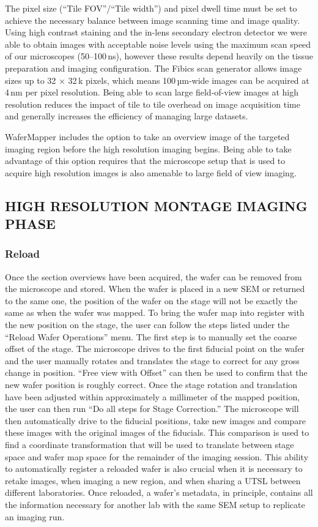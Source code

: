 \documentclass{article}
\begin{document}
The pixel size (“Tile FOV”/“Tile width”) and pixel dwell time must be set to achieve the necessary balance between image scanning time and image quality. Using high contrast staining and the in-lens secondary electron detector we were able to obtain images with acceptable noise levels using the maximum scan speed of our microscopes (50–100\,ns), however these results depend heavily on the tissue preparation and imaging configuration. The Fibics scan generator allows image sizes up to 32 × 32\,k pixels, which means 100\,µm-wide images can be acquired at 4\,nm per pixel resolution. Being able to scan large field-of-view images at high resolution reduces the impact of tile to tile overhead on image acquisition time and generally increases the efficiency of managing large datasets.

WaferMapper includes the option to take an overview image of the targeted imaging region before the high resolution imaging begins. Being able to take advantage of this option requires that the microscope setup that is used to acquire high resolution images is also amenable to large field of view imaging.

\subsection*{HIGH RESOLUTION MONTAGE IMAGING PHASE}
\subsubsection*{Reload}

Once the section overviews have been acquired, the wafer can be removed from the microscope and stored. When the wafer is placed in a new SEM or returned to the same one, the position of the wafer on the stage will not be exactly the same as when the wafer was mapped. To bring the wafer map into register with the new position on the stage, the user can follow the steps listed under the “Reload Wafer Operations” menu. The first step is to manually set the coarse offset of the stage. The microscope drives to the first fiducial point on the wafer and the user manually rotates and translates the stage to correct for any gross change in position. “Free view with Offset” can then be used to confirm that the new wafer position is roughly correct. Once the stage rotation and translation have been adjusted within approximately a millimeter of the mapped position, the user can then run “Do all steps for Stage Correction.” The microscope will then automatically drive to the fiducial positions, take new images and compare these images with the original images of the fiducials. This comparison is used to find a coordinate transformation that will be used to translate between stage space and wafer map space for the remainder of the imaging session. This ability to automatically register a reloaded wafer is also crucial when it is necessary to retake images, when imaging a new region, and when sharing a UTSL between different laboratories. Once reloaded, a wafer’s metadata, in principle, contains all the information necessary for another lab with the same SEM setup to replicate an imaging run.
\end{document}
